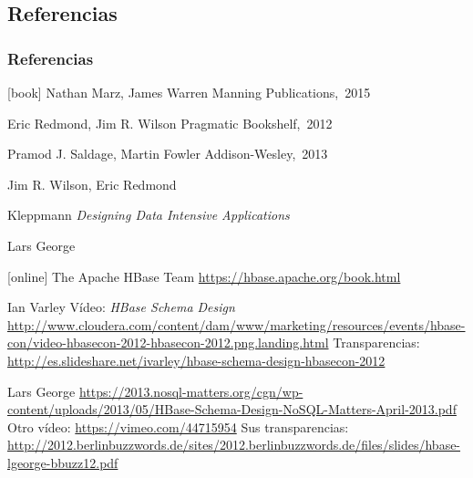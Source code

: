 \documentclass[14pt]{beamer}
\begin{document}
\begin{frame}
\begin{itemize}
\section{Referencias}

\begin{frame}
  \frametitle{Referencias}

\begin{thebibliography}{Paternostro, 2009}

[book]
Nathan Marz, James Warren
\newblock Manning Publications,~2015

Eric Redmond, Jim R. Wilson
\newblock Pragmatic  Bookshelf,~2012

Pramod J. Saldage, Martin Fowler
\newblock Addison-Wesley,~2013

Jim R. Wilson, Eric Redmond

Kleppmann
\newblock  \emph{Designing Data Intensive Applications}

Lars George

[online]
  The Apache HBase Team
  \newblock \url{https://hbase.apache.org/book.html}

  Ian Varley
\newblock Vídeo: {\em HBase Schema Design}
\newblock
\url{http://www.cloudera.com/content/dam/www/marketing/resources/events/hbase-con/video-hbasecon-2012-hbasecon-2012.png.landing.html}
\newblock Transparencias:
\url{http://es.slideshare.net/ivarley/hbase-schema-design-hbasecon-2012}

  Lars George
\newblock \url{https://2013.nosql-matters.org/cgn/wp-content/uploads/2013/05/HBase-Schema-Design-NoSQL-Matters-April-2013.pdf}
\newblock Otro vídeo: \url{https://vimeo.com/44715954}
\newblock Sus transparencias: \url{http://2012.berlinbuzzwords.de/sites/2012.berlinbuzzwords.de/files/slides/hbase-lgeorge-bbuzz12.pdf}


\end{thebibliography}
\end{frame}
\end{itemize}
\end{frame}
\end{document}
